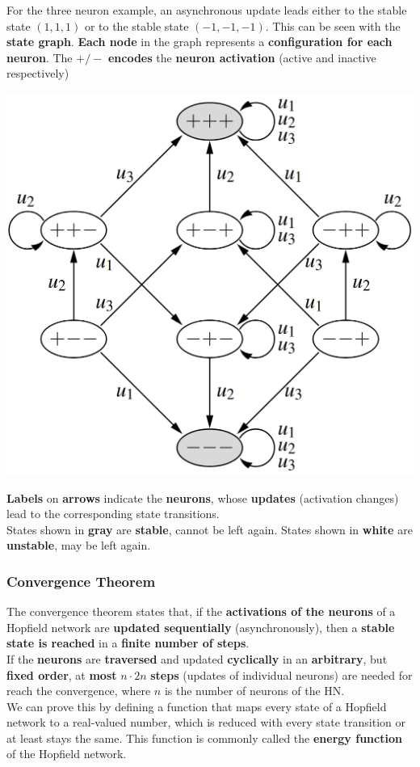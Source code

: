 \documentclass[11pt]{article}
\begin{document}
		For the three neuron example, an asynchronous update leads either to the stable state $(1, 1, 1)$ or to the stable state $(-1, -1, -1)$. This can be seen with the \textbf{state graph}. \textbf{Each node} in the graph represents a \textbf{configuration for each neuron}. The $+/-$ \textbf{encodes} the \textbf{neuron activation} (active and inactive respectively)
		\begin{center}
			\includegraphics[width=0.6\columnwidth]{img/NN/HN3}
		\end{center}
		\textbf{Labels} on \textbf{arrows} indicate the \textbf{neurons}, whose \textbf{updates} (activation changes) lead to the corresponding state transitions. \\
		States shown in \textbf{gray} are \textbf{stable}, cannot be left again. States shown in \textbf{white} are \textbf{unstable}, may be left again.\\
		
		\newpage
		
		\subsubsection{Convergence Theorem}
		The convergence theorem states that, if the \textbf{activations of the neurons} of a Hopfield network are \textbf{updated sequentially} (asynchronously), then a \textbf{stable state is reached} in a \textbf{finite number of steps}.\\
		If the \textbf{neurons} are \textbf{traversed} and updated \textbf{cyclically} in an \textbf{arbitrary}, but \textbf{fixed order}, at \textbf{most} $n \cdot 2n$ \textbf{steps} (updates of individual neurons) are needed for reach the convergence, where $n$ is the number of neurons of the HN.\\
		
		We can prove this by defining a function that maps every state of a Hopfield network to a real-valued number, which is reduced with every state transition or at least stays the same. This function is commonly called the \textbf{energy function} of the Hopfield network.\\
		
\end{document}
